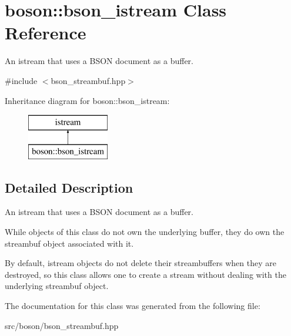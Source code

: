\hypertarget{classboson_1_1bson__istream}{}\section{boson\+:\+:bson\+\_\+istream Class Reference}
\label{classboson_1_1bson__istream}


An istream that uses a B\+S\+ON document as a buffer.  




{\ttfamily \#include $<$bson\+\_\+streambuf.\+hpp$>$}

Inheritance diagram for boson\+:\+:bson\+\_\+istream\+:\begin{figure}[H]
\begin{center}
\leavevmode
\includegraphics[height=2.000000cm]{classboson_1_1bson__istream}
\end{center}
\end{figure}


\subsection{Detailed Description}
An istream that uses a B\+S\+ON document as a buffer. 

While objects of this class do not own the underlying buffer, they do own the streambuf object associated with it.

By default, istream objects do not delete their streambuffers when they are destroyed, so this class allows one to create a stream without dealing with the underlying streambuf object. 

The documentation for this class was generated from the following file\+:\begin{DoxyCompactItemize}
\item 
src/boson/bson\+\_\+streambuf.\+hpp\end{DoxyCompactItemize}

